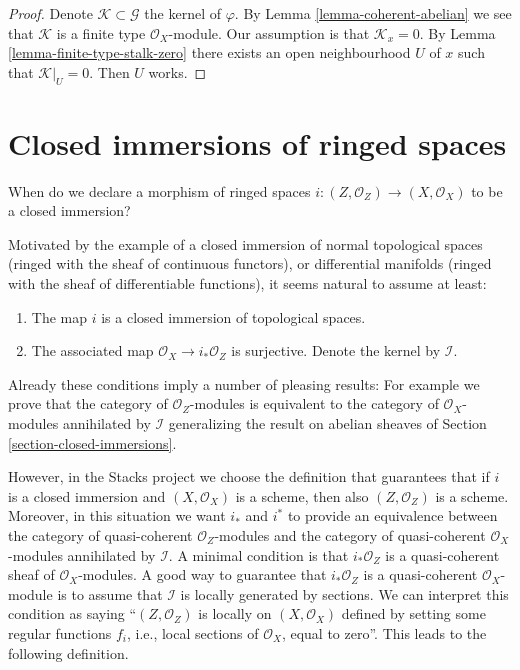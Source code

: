 \documentclass{stacks-project}
\theoremstyle{plain}
\theoremstyle{definition}
\theoremstyle{remark}
\numberwithin{equation}{subsection}
\begin{document}
\begin{proof}
Denote $\mathcal{K} \subset \mathcal{G}$ the kernel of $\varphi$.
By Lemma \ref{lemma-coherent-abelian} we see that $\mathcal{K}$ is
a finite type $\mathcal{O}_X$-module. Our assumption is that
$\mathcal{K}_x = 0$. By Lemma \ref{lemma-finite-type-stalk-zero}
there exists an open neighbourhood $U$ of $x$ such that $\mathcal{K}|_U = 0$.
Then $U$ works.
\end{proof}













\section{Closed immersions of ringed spaces}
\label{section-closed-immersion}

\noindent
When do we declare a morphism of ringed spaces
$i : (Z, \mathcal{O}_Z) \to (X, \mathcal{O}_X)$
to be a closed immersion?

\medskip\noindent
Motivated by the example of a closed immersion of normal topological spaces
(ringed with the sheaf of continuous functors), or differential manifolds
(ringed with the sheaf of differentiable functions), it seems natural to
assume at least:
\begin{enumerate}
\item The map $i$ is a closed immersion of topological spaces.
\item The associated map $\mathcal{O}_X \to i_*\mathcal{O}_Z$
is surjective. Denote the kernel by $\mathcal{I}$.
\end{enumerate}
Already these conditions imply a number of pleasing results: For example
we prove that the category of $\mathcal{O}_Z$-modules is equivalent to
the category of $\mathcal{O}_X$-modules annihilated by $\mathcal{I}$
generalizing the result on abelian sheaves of
Section \ref{section-closed-immersions}.

\medskip\noindent
However, in the Stacks project we choose the
definition that guarantees that if $i$ is a closed immersion
and $(X, \mathcal{O}_X)$ is a scheme, then also $(Z, \mathcal{O}_Z)$
is a scheme. Moreover, in this situation we want $i_*$ and $i^*$
to provide an equivalence between the category of quasi-coherent
$\mathcal{O}_Z$-modules and the category of quasi-coherent
$\mathcal{O}_X$-modules annihilated by $\mathcal{I}$.
A minimal condition is that $i_*\mathcal{O}_Z$ is a
quasi-coherent sheaf of $\mathcal{O}_X$-modules.
A good way to guarantee that $i_*\mathcal{O}_Z$ is a
quasi-coherent $\mathcal{O}_X$-module is to assume that
$\mathcal{I}$ is locally generated by sections.
We can interpret this condition as saying ``$(Z, \mathcal{O}_Z)$ is
locally on $(X, \mathcal{O}_X)$ defined by setting some regular functions
$f_i$, i.e., local sections of $\mathcal{O}_X$, equal to zero''.
This leads to the following definition.
\end{document}
